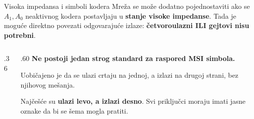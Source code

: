 \begin{frame}[t,label=03-s021b]{Visoka impedansa i simboli kodera}
\setlength{\parskip}{0pt}
Mreža se može dodatno pojednostaviti ako se \(A_1,A_0\) neaktivnog kodera
postavljaju u \textcolor{DEisticanje}{\textbf{stanje visoke impedanse}}.
Tada je moguće direktno povezati odgovarajuće izlaze:
\textbf{četvoroulazni ILI gejtovi nisu potrebni}.
\par\vspace{2mm}
\begin{columns}[c,onlytextwidth]
\begin{column}{.36\textwidth}\centering
{}
\par\vspace{1mm}

\end{column}
\begin{column}{.60\textwidth}
\textcolor{DEisticanje}{\textbf{Ne postoji jedan strog standard za raspored MSI simbola.}}
\par\vspace{2mm}
Uobičajeno je da se ulazi crtaju na jednoj, a izlazi na drugoj strani,
bez njihovog mešanja.
\par\vspace{2mm}
Najčešće su \textbf{ulazi levo, a izlazi desno}.
Svi priključci moraju imati jasne oznake da bi se šema mogla pratiti.
\end{column}
\end{columns}
\end{frame}
